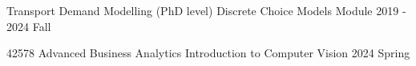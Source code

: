 

\vspace{-1.ex}
\begin{cvteachings}
  \cvteaching
	{Transport Demand Modelling (PhD level)} %
	{Discrete Choice Models Module} %
	{} %
	{2019 - 2024 Fall} %
\end{cvteachings}


\vspace{-1.ex}
\begin{cvteachings}
  \cvteaching
	{42578 Advanced Business Analytics} %
	{Introduction to Computer Vision} %
	{} %
	{2024 Spring} %
\end{cvteachings}
